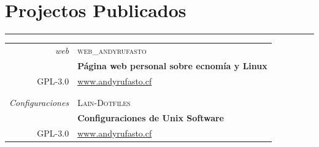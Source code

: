 \documentclass[a4paper,10pt]{article}
\newcommand{\tvspace}{\footnotesize{}\\\multicolumn{2}{c}{}}
\begin{document}
\newpage

\section{Projectos Publicados}
\hrule
\begin{tabular}{r|p{11cm}}
  \emph{web}                   & \textsc{web\_andyrufasto}\\
	                             & \textbf{Página web personal sobre ecnomía y Linux} \\
	\textsc{GPL-3.0}             & \href{https://www.andyrufasto.cf}{www.andyrufasto.cf}\\
				                       & \tvspace \\

  \emph{Configuraciones}       & \textsc{Lain-Dotfiles}\\
	                             & \textbf{Configuraciones de Unix Software} \\
	\textsc{GPL-3.0}             & \href{https://www.andyrufasto.cf}{www.andyrufasto.cf}
															
\end{tabular}
\end{document}
